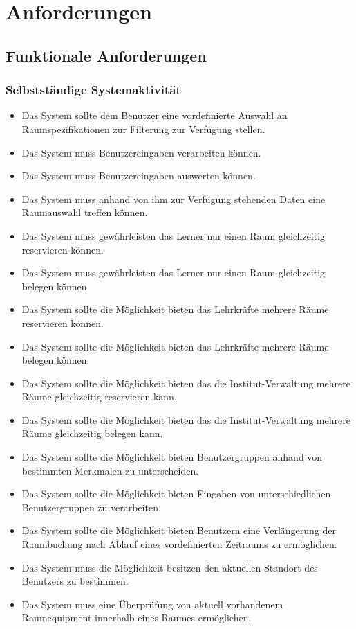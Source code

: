 
\section{Anforderungen}

\subsection{Funktionale Anforderungen}
\label{sec:Funktionale_Anfoderungen}

\subsubsection{Selbstständige Systemaktivität}
\label{sec:Selbstständige_Systemaktivität}

\begin{itemize}
	\item Das System sollte dem Benutzer eine vordefinierte Auswahl an Raumspezifikationen zur Filterung zur Verfügung stellen.
	\item Das System muss Benutzereingaben verarbeiten können.
	\item Das System muss Benutzereingaben auswerten können.
	\item Das System muss anhand von ihm zur Verfügung stehenden Daten eine Raumauswahl treffen können.
	\item Das System muss gewährleisten das Lerner nur einen Raum gleichzeitig reservieren können.
	\item Das System muss gewährleisten das Lerner nur einen Raum gleichzeitig belegen können.
	\item Das System sollte die Möglichkeit bieten das Lehrkräfte mehrere Räume reservieren können.
	\item Das System sollte die Möglichkeit bieten das Lehrkräfte mehrere Räume belegen können.
	\item Das System sollte die Möglichkeit bieten das die Institut-Verwaltung mehrere Räume gleichzeitig reservieren kann.
	\item Das System sollte die Möglichkeit bieten das die Institut-Verwaltung mehrere Räume gleichzeitig belegen kann.
	\item Das System sollte die Möglichkeit bieten Benutzergruppen anhand von bestimmten Merkmalen zu unterscheiden.
	\item Das System sollte die Möglichkeit bieten Eingaben von unterschiedlichen Benutzergruppen zu verarbeiten. 
	\item Das System sollte die Möglichkeit bieten Benutzern eine Verlängerung der Raumbuchung nach Ablauf eines vordefinierten Zeitraums zu ermöglichen.
	\item Das System muss die Möglichkeit besitzen den aktuellen Standort des Benutzers zu bestimmen.
	\item Das System muss eine Überprüfung von aktuell vorhandenem Raumequipment innerhalb eines Raumes ermöglichen.
\end{itemize}

